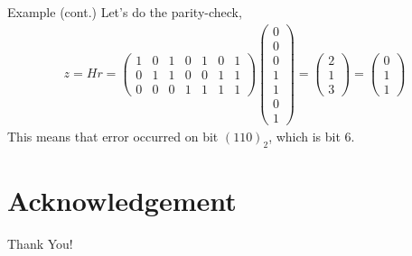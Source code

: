 \documentclass[10pt]{beamer}
\begin{document}
\begin{frame}{Example (cont.)}
     Let's do the parity-check,
    \begin{align*}
        z = H r = 
        \begin{pmatrix}
        1&0&1&0&1&0&1\\
        0&1&1&0&0&1&1\\
        0&0&0&1&1&1&1
        \end{pmatrix}
        \begin{pmatrix}
        0\\
        0\\
        0\\
        1\\
        1\\
        0\\
        1
        \end{pmatrix}
        =
        \begin{pmatrix}
        2\\
        1\\
        3
        \end{pmatrix}
        =
        \begin{pmatrix}
        0\\
        1\\
        1
        \end{pmatrix}
    \end{align*}
This means that error occurred on bit $(110)_2$, which is bit 6.
\end{frame}


\section*{Acknowledgement}  
\begin{frame}
\textcolor{ehimeColor}{\Huge{\centerline{Thank You!}}}
\end{frame}
\end{document}
